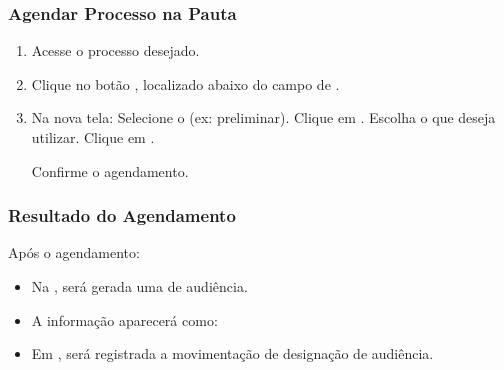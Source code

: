 \documentclass[letterpaper,10pt,brazil]{sphinxmanual}
\begin{document}
\subsubsection{Agendar Processo na Pauta}
\label{\detokenize{projud_46_comopautaraudiencia:agendar-processo-na-pauta}}\begin{enumerate}
%
\item {} 
\sphinxAtStartPar
Acesse o processo desejado.

\item {} 
\sphinxAtStartPar
Clique no botão , localizado abaixo do campo de .

\item {} 
\sphinxAtStartPar
Na nova tela:
\sphinxhyphen{} Selecione o  (ex: preliminar).
\sphinxhyphen{} Clique em .
\sphinxhyphen{} Escolha o  que deseja utilizar.
\sphinxhyphen{} Clique em .

\sphinxAtStartPar
Confirme o agendamento.

\end{enumerate}


\subsubsection{Resultado do Agendamento}
\label{\detokenize{projud_46_comopautaraudiencia:resultado-do-agendamento}}
\sphinxAtStartPar
Após o agendamento:
\begin{itemize}
\item {} 
\sphinxAtStartPar
Na , será gerada uma  de audiência.

\item {} 
\sphinxAtStartPar
A informação aparecerá como:

\item {} 
\sphinxAtStartPar
Em , será registrada a movimentação de designação de audiência.

\end{itemize}
\end{document}
